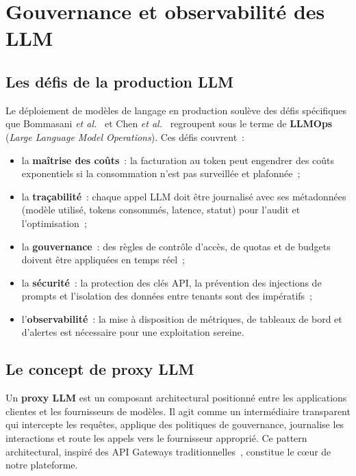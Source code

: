 \section{Gouvernance et observabilité des LLM}
\label{sec:gouvernance}

\subsection{Les défis de la production LLM}

Le déploiement de modèles de langage en production soulève des défis spécifiques que Bommasani \textit{et al.}~\cite{bommasani2022} et Chen \textit{et al.}~\cite{chen2024llmops} regroupent sous le terme de \textbf{LLMOps} (\textit{Large Language Model Operations}). Ces défis couvrent~:

\begin{itemize}[noitemsep]
    \item la \textbf{maîtrise des coûts}~: la facturation au token peut engendrer des coûts exponentiels si la consommation n'est pas surveillée et plafonnée~;
    \item la \textbf{traçabilité}~: chaque appel LLM doit être journalisé avec ses métadonnées (modèle utilisé, tokens consommés, latence, statut) pour l'audit et l'optimisation~;
    \item la \textbf{gouvernance}~: des règles de contrôle d'accès, de quotas et de budgets doivent être appliquées en temps réel~;
    \item la \textbf{sécurité}~: la protection des clés API, la prévention des injections de prompts et l'isolation des données entre tenants sont des impératifs~;
    \item l'\textbf{observabilité}~: la mise à disposition de métriques, de tableaux de bord et d'alertes est nécessaire pour une exploitation sereine.
\end{itemize}

\subsection{Le concept de proxy LLM}

Un \textbf{proxy LLM} est un composant architectural positionné entre les applications clientes et les fournisseurs de modèles. Il agit comme un intermédiaire transparent qui intercepte les requêtes, applique des politiques de gouvernance, journalise les interactions et route les appels vers le fournisseur approprié. Ce pattern architectural, inspiré des API Gateways traditionnelles~\cite{fielding2000}, constitue le c\oe ur de notre plateforme.

